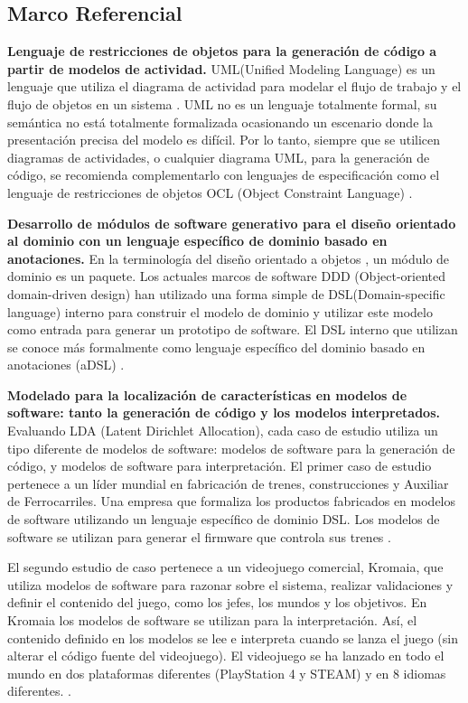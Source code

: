 \documentclass[12pt,a4paper,final, xcolor=table, table]{article}
\begin{document}
	\subsection{Marco Referencial}
	
	\textbf{Lenguaje de restricciones de objetos para la generación de código
	a partir de modelos de actividad.} UML(Unified Modeling Language) es un lenguaje que utiliza el diagrama de actividad para modelar el flujo de trabajo y el flujo de objetos en un sistema \parencite{Improving}. UML no es un lenguaje totalmente formal, su semántica no está totalmente formalizada ocasionando un escenario donde la presentación precisa del modelo es difícil. Por lo tanto, siempre que se utilicen diagramas de actividades, o cualquier diagrama UML, para la generación de código, se recomienda complementarlo con lenguajes de especificación como el lenguaje de restricciones de objetos OCL (Object Constraint Language) \parencite{Object}.   

	\textbf{Desarrollo de módulos de software generativo para el diseño orientado al dominio con un lenguaje específico de dominio basado en anotaciones. }En la terminología del diseño orientado a objetos \parencite{Feature}, un módulo de dominio es un paquete. Los actuales marcos de software DDD (Object-oriented domain-driven design) han utilizado una forma simple de DSL(Domain-specific language) interno para construir el modelo de dominio y utilizar este modelo como entrada para generar un prototipo de software. El DSL interno que utilizan se conoce más formalmente como lenguaje específico del dominio basado en anotaciones (aDSL) \parencite{Generative}. 
	
	\textbf{Modelado para la localización de características en modelos de software: tanto la generación de código y los modelos interpretados. }Evaluando LDA (Latent Dirichlet Allocation), cada caso de estudio utiliza un tipo diferente de modelos de software: modelos de software para la generación de código, y modelos de software para interpretación. El primer caso de estudio pertenece a un líder mundial en fabricación de trenes, construcciones y Auxiliar de Ferrocarriles. Una empresa que formaliza los productos fabricados en modelos de software utilizando un lenguaje específico de dominio DSL. Los modelos de software se utilizan para generar el firmware que controla sus trenes \parencite{Topic}. 
	
	El segundo estudio de caso pertenece a un videojuego comercial, Kromaia, que utiliza modelos de software para razonar sobre el sistema, realizar validaciones y definir el contenido del juego, como los jefes, los mundos y los objetivos. En Kromaia los modelos de software se utilizan para la interpretación. Así, el contenido definido en los modelos se lee e interpreta cuando se lanza el juego (sin alterar el código fuente del videojuego). El videojuego se ha lanzado en todo el mundo en dos plataformas diferentes (PlayStation 4 y STEAM) y en 8 idiomas diferentes. \parencite{Topic}.
	
\end{document}
